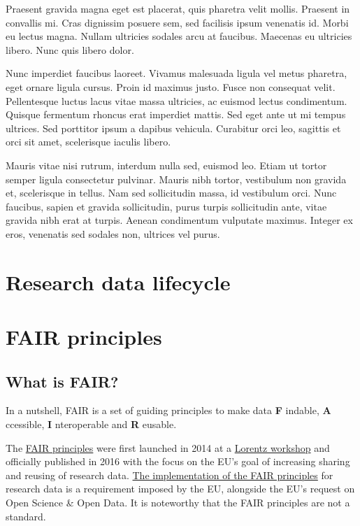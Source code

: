 \documentclass[
]{book}
\begin{document}
Praesent gravida magna eget est placerat, quis pharetra velit mollis. Praesent in convallis mi. Cras dignissim posuere sem, sed facilisis ipsum venenatis id. Morbi eu lectus magna. Nullam ultricies sodales arcu at faucibus. Maecenas eu ultricies libero. Nunc quis libero dolor.

Nunc imperdiet faucibus laoreet. Vivamus malesuada ligula vel metus pharetra, eget ornare ligula cursus. Proin id maximus justo. Fusce non consequat velit. Pellentesque luctus lacus vitae massa ultricies, ac euismod lectus condimentum. Quisque fermentum rhoncus erat imperdiet mattis. Sed eget ante ut mi tempus ultrices. Sed porttitor ipsum a dapibus vehicula. Curabitur orci leo, sagittis et orci sit amet, scelerisque iaculis libero.

Mauris vitae nisi rutrum, interdum nulla sed, euismod leo. Etiam ut tortor semper ligula consectetur pulvinar. Mauris nibh tortor, vestibulum non gravida et, scelerisque in tellus. Nam sed sollicitudin massa, id vestibulum orci. Nunc faucibus, sapien et gravida sollicitudin, purus turpis sollicitudin ante, vitae gravida nibh erat at turpis. Aenean condimentum vulputate maximus. Integer ex eros, venenatis sed sodales non, ultrices vel purus.

\hypertarget{research-data-lifecycle}{%
\chapter{Research data lifecycle}\label{research-data-lifecycle}}

\hypertarget{fair-principles}{%
\chapter{FAIR principles}\label{fair-principles}}

\hypertarget{what-is-fair}{%
\section{What is FAIR?}\label{what-is-fair}}

In a nutshell, FAIR is a set of guiding principles to make data \textbf{F} indable, \textbf{A} ccessible, \textbf{I} nteroperable and \textbf{R} eusable.

The \href{https://www.go-fair.org/fair-principles/}{FAIR principles} were first launched in 2014 at a \href{https://www.lorentzcenter.nl/}{Lorentz workshop} and officially published in 2016 with the focus on the EU's goal of increasing sharing and reusing of research data. \href{https://eur-lex.europa.eu/legal-content/EN/TXT/?uri=uriserv:OJ.L_.2019.172.01.0056.01.ENG}{The implementation of the FAIR principles} for research data is a requirement imposed by the EU, alongside the EU's request on Open Science \& Open Data. It is noteworthy that the FAIR principles are not a standard.
\end{document}
